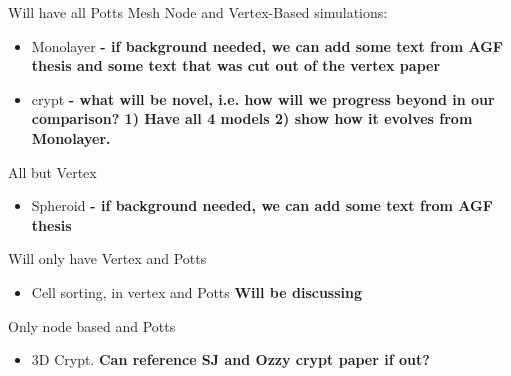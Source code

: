 \documentclass{siamltex}
\newcommand{\highlight}[1]{{\color{red} \bf{#1}}}
\begin{document}
\noindent Will have all Potts Mesh Node and Vertex-Based simulations:
\begin{itemize}
  \item Monolayer \highlight{- if background needed, we can add some text from AGF thesis and some text that was cut out of the vertex paper}
  \item crypt \highlight{- what will be novel, i.e. how will we progress beyond \citet{Osborne2010Hybrid} in our comparison? 1) Have all 4 models 2) show how it evolves from Monolayer.}
\end{itemize}
All but Vertex
\begin{itemize}
  \item Spheroid \highlight{- if background needed, we can add some text from AGF thesis}
\end{itemize}
Will only have Vertex and Potts
\begin{itemize}
  \item Cell sorting, in vertex and Potts \highlight{Will  be discussing }
\end{itemize}
Only node based and Potts
\begin{itemize}
  \item 3D Crypt. \highlight{Can reference SJ and Ozzy crypt paper if out?}
\end{itemize}


\end{document}
